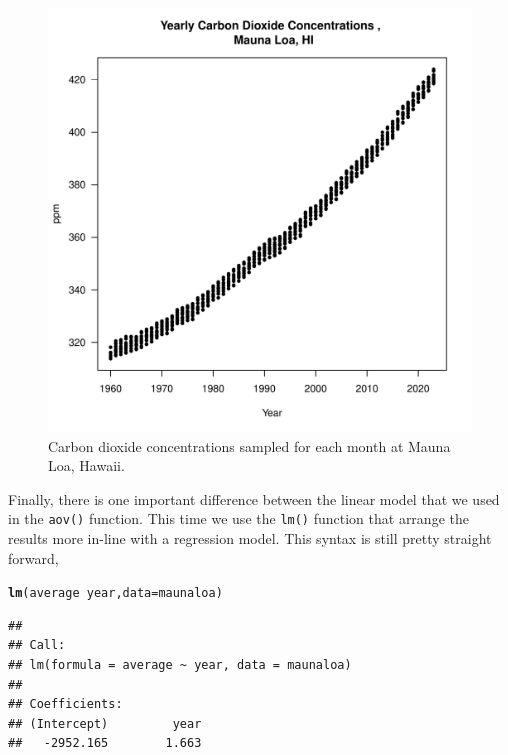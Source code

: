\documentclass{tufte-handout}\usepackage[]{graphicx}\usepackage[]{xcolor}
\makeatletter
\def\maxwidth{ %
  \ifdim\Gin@nat@width>\linewidth
    \linewidth
  \else
    \Gin@nat@width
  \fi
}
\newcommand{\hlopt}[1]{\textcolor[rgb]{0,0,0}{#1}}%
\newcommand{\hlstd}[1]{\textcolor[rgb]{0.345,0.345,0.345}{#1}}%
\newcommand{\hlkwc}[1]{\textcolor[rgb]{0.333,0.667,0.333}{#1}}%
\newcommand{\hlkwd}[1]{\textcolor[rgb]{0.737,0.353,0.396}{\textbf{#1}}}%
\newenvironment{kframe}{%
 \def\at@end@of@kframe{}%
 \ifinner\ifhmode%
  \def\at@end@of@kframe{\end{minipage}}%
  \begin{minipage}{\columnwidth}%
 \fi\fi%
 \def\FrameCommand##1{\hskip\@totalleftmargin \hskip-\fboxsep
 \colorbox{shadecolor}{##1}\hskip-\fboxsep
     \hskip-\linewidth \hskip-\@totalleftmargin \hskip\columnwidth}%
 \MakeFramed {\advance\hsize-\width
   \@totalleftmargin\z@ \linewidth\hsize
   \@setminipage}}%
 {\par\unskip\endMakeFramed%
 \at@end@of@kframe}
\newenvironment{knitrout}{}{} %
\makeatother
\begin{document}
\begin{figure}
\label{fig:maunaloa}
\caption{Carbon dioxide concentrations sampled for each month at Mauna Loa, Hawaii.}
\begin{knitrout}
\color{fgcolor}
\includegraphics[width=\maxwidth]{figure/unnamed-chunk-52-1} 
\end{knitrout}
\end{figure}


Finally, there is one important difference between the linear model that we used in the \texttt{aov()} function. This time we use the \texttt{lm()} function that arrange the results more in-line with a regression model.
This syntax is still pretty straight forward,  

\begin{knitrout}
\color{fgcolor}\begin{kframe}
\begin{alltt}
\hlkwd{lm}\hlstd{(average} \hlopt{~} \hlstd{year,} \hlkwc{data}\hlstd{=maunaloa)}
\end{alltt}
\begin{verbatim}
## 
## Call:
## lm(formula = average ~ year, data = maunaloa)
## 
## Coefficients:
## (Intercept)         year  
##   -2952.165        1.663
\end{verbatim}
\end{kframe}
\end{knitrout}
\end{document}
